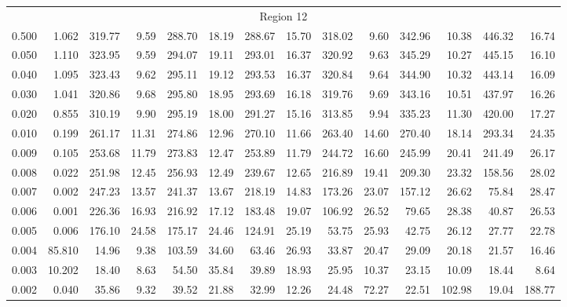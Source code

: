 \begin{tabular}{@{}lrrrrrrrrrrrrr@{}}
\midrule
\multicolumn{14}{c}{Region 12} \\
\cmidrule{1-14}
0.500 & 1.062 & 319.77 & 9.59 & 288.70 & 18.19 & 288.67 & 15.70 & 318.02 & 9.60 & 342.96 & 10.38 & 446.32 & 16.74 \\
0.050 & 1.110 & 323.95 & 9.59 & 294.07 & 19.11 & 293.01 & 16.37 & 320.92 & 9.63 & 345.29 & 10.27 & 445.15 & 16.10 \\
0.040 & 1.095 & 323.43 & 9.62 & 295.11 & 19.12 & 293.53 & 16.37 & 320.84 & 9.64 & 344.90 & 10.32 & 443.14 & 16.09 \\
0.030 & 1.041 & 320.86 & 9.68 & 295.80 & 18.95 & 293.69 & 16.18 & 319.76 & 9.69 & 343.16 & 10.51 & 437.97 & 16.26 \\
0.020 & 0.855 & 310.19 & 9.90 & 295.19 & 18.00 & 291.27 & 15.16 & 313.85 & 9.94 & 335.23 & 11.30 & 420.00 & 17.27 \\
0.010 & 0.199 & 261.17 & 11.31 & 274.86 & 12.96 & 270.10 & 11.66 & 263.40 & 14.60 & 270.40 & 18.14 & 293.34 & 24.35 \\
0.009 & 0.105 & 253.68 & 11.79 & 273.83 & 12.47 & 253.89 & 11.79 & 244.72 & 16.60 & 245.99 & 20.41 & 241.49 & 26.17 \\
0.008 & 0.022 & 251.98 & 12.45 & 256.93 & 12.49 & 239.67 & 12.65 & 216.89 & 19.41 & 209.30 & 23.32 & 158.56 & 28.02 \\
0.007 & 0.002 & 247.23 & 13.57 & 241.37 & 13.67 & 218.19 & 14.83 & 173.26 & 23.07 & 157.12 & 26.62 & 75.84 & 28.47 \\
0.006 & 0.001 & 226.36 & 16.93 & 216.92 & 17.12 & 183.48 & 19.07 & 106.92 & 26.52 & 79.65 & 28.38 & 40.87 & 26.53 \\
0.005 & 0.006 & 176.10 & 24.58 & 175.17 & 24.46 & 124.91 & 25.19 & 53.75 & 25.93 & 42.75 & 26.12 & 27.77 & 22.78 \\
0.004 & 85.810 & 14.96 & 9.38 & 103.59 & 34.60 & 63.46 & 26.93 & 33.87 & 20.47 & 29.09 & 20.18 & 21.57 & 16.46 \\
0.003 & 10.202 & 18.40 & 8.63 & 54.50 & 35.84 & 39.89 & 18.93 & 25.95 & 10.37 & 23.15 & 10.09 & 18.44 & 8.64 \\
0.002 & 0.040 & 35.86 & 9.32 & 39.52 & 21.88 & 32.99 & 12.26 & 24.48 & 72.27 & 22.51 & 102.98 & 19.04 & 188.77 \\


\end{tabular}
